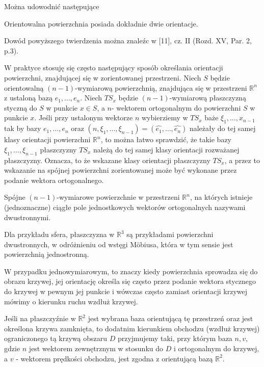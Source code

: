 \documentclass[leqno]{article}
\begin{document}
\begin{justify}
Można udowodnić następujące 

\begin{theorem}
    Orientowalna powierzchnia posiada dokładnie dwie orientacje.
\end{theorem}

Dowód powyższego twierdzenia można znaleźc w [11], cz. II (Rozd. XV, Par. 2, p.3).

W praktyce stosuję się często następujący sposób określania orientacji powierzchni, znajdującej się w zorientowanej przestrzeni.
Niech $S$ będzie orientowalną $(n-1)$-wymiarową powierzchnią, znajdująca się w przestrzeni $\mathbb{R}^n$ z ustaloną bazą $e_1, \ldots, e_n$.
Niech $TS_x$ będzie $(n-1)$-wymiarową płaszczyzną styczną do $S$ w punkcie $x \in S$, a $n$- wektorem ortogonalnym do powierzchni $S$ w punkcie $x$.
Jeśli przy ustalonym wektorze $n$ wybierziemy w $TS_x$ baże $\xi_1, \ldots, x_{n-1}$ tak by bazy $e_1, \ldots, e_n$ oraz $(n, \xi_1, \ldots, \xi_{n-1}) = (\hat{e_1}, \ldots, \hat{e_n})$
należały do tej samej klasy orientacji powierzchni $\mathbb{R}^n$, to można łatwo sprawdzić, że takie bazy $\xi_1, \ldots, \xi_{n-1}$ płaszczyzny 
$TS_x$ należą do tej samej klasy orientacji rozważanej płaszczyzny. Oznacza, to że wskazane klasy orientacji płaszczyzny $TS_x$, a przez to wskazanie na 
spójnej powierzchni zorientowanej może być wykonane przez podanie wektora ortogonalnego.

\begin{defn}
    Spójne $(n-1)$-wymiarowe powierzchnie w przestrzeni $\mathbb{R}^n$, na których istnieje (jednoznaczne) ciągłe pole jednostkowych wektorów ortogonalnych
    nazywami dwustronnymi.
\end{defn}

Dla przykładu sfera, płaszczyzna w $\mathbb{R}^3$ są przykładami powierzchni dwustronnych, w odróżnieniu od wstęgi Möbiusa, która w tym sensie jest powierzchnią jednostronną. 

W przypadku jednowymiarowym, to znaczy kiedy powierzchnia sprowadza się do obrazu krzywej, jej orientację określa się często przez podanie wektora stycznego do krzywej 
w pewnym jej punkcie i wówczas często zamiast orientacji krzywej mówimy o kierunku ruchu wzdłuż krzywej.


\begin{defn}
    Jeśli na płaszczyźnie w $\mathbb{R}^2$ jest wybrana baza orientującą tę przestrzeń oraz jest określona krzywa zamknięta, to dodatnim kierunkiem obchodzu (wzdłuż krzywej)
    ograniczonego tą krzywą obszaru $D$ przyjmujemy taki, przy którym baza $n, v$, gdzie $n$ jest wektorem zewnętrznym w stosunku do $D$ i ortogonalnym do krzywej, a $v$ - wektorem prędkości obchodzu, jest zgodna z orientującą bazą $\mathbb{R}^2$.
\end{defn}


\end{justify}
\end{document}
